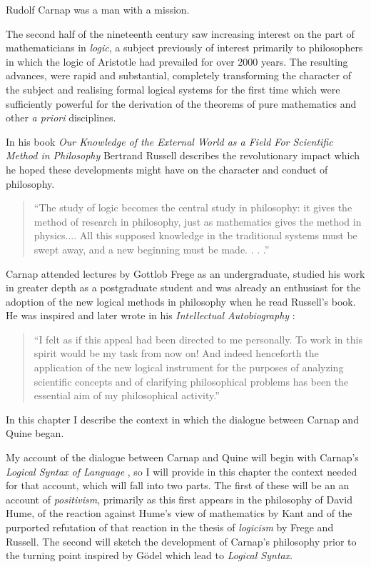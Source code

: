 Rudolf Carnap was a man with a mission.

The second half of the nineteenth century saw increasing interest on the part of mathematicians
in \emph{logic}, a subject previously of interest primarily to philosophers
in which the logic of Aristotle had prevailed for over 2000 years.
The resulting advances, were rapid and substantial, completely transforming the character
of the subject and realising formal logical systems for the first time which were sufficiently powerful
for the derivation of the theorems of pure mathematics and other \emph{a priori} disciplines.  

In his book \emph{Our Knowledge of the External World as a Field For Scientific Method in Philosophy} \cite{russell21} Bertrand Russell describes the revolutionary impact which he hoped these developments might have on the character and conduct of philosophy.

\begin{quote}
``The study of logic becomes the central study in philosophy: it gives the method of research in philosophy, just as mathematics gives the method in physics....	
All this supposed knowledge in the traditional systems must be swept away, and a new beginning must be made. . . .''
\end{quote}

Carnap attended lectures by Gottlob Frege as an undergraduate, studied his work in greater depth as a postgraduate student
and was already an enthusiast for the adoption of the new logical methods in philosophy when he read Russell's
book.
He was inspired and later wrote in his \emph{Intellectual Autobiography}
\cite{carnap63}:

\begin{quotation}
``I felt as if this appeal had been directed to me personally.
To work in this spirit would be my task from now on! And indeed henceforth the application of the new logical instrument for the purposes of analyzing scientific concepts and of clarifying philosophical problems has been the essential aim of my philosophical activity.''
\end{quotation}

In this chapter I describe the context in which the dialogue between
Carnap and Quine began.

My account of the dialogue between Carnap and Quine will begin with Carnap's {\it Logical Syntax of Language} \cite{carnap34, carnap37}, so I will provide in this chapter the context needed for that account, which will fall into two parts.
The first of these will be an an account of \emph{positivism}, primarily as this first appears in the philosophy of David Hume, of the reaction against Hume's view of mathematics by Kant and of the purported refutation of that reaction in the thesis of \emph{logicism} by Frege and Russell.
The second will sketch the development of Carnap's philosophy prior to the turning point inspired by G\"odel which lead to {\it Logical Syntax}.

